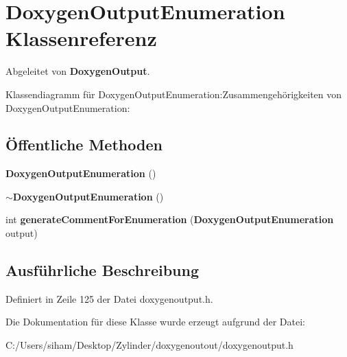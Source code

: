 \section{Doxygen\-Output\-Enumeration Klassenreferenz}
\label{class_doxygen_output_enumeration}
Abgeleitet von {\bf Doxygen\-Output}.

Klassendiagramm f\"{u}r Doxygen\-Output\-Enumeration:Zusammengeh\"{o}rigkeiten von Doxygen\-Output\-Enumeration:\subsection*{\"{O}ffentliche Methoden}
\begin{CompactItemize}
\item 
{\bf Doxygen\-Output\-Enumeration} ()\label{class_doxygen_output_enumeration_7ae367bb085b6095370b8ad098d81681}

\item 
{\bf $\sim$Doxygen\-Output\-Enumeration} ()\label{class_doxygen_output_enumeration_63cac653795dcc30b645c304c0881327}

\item 
int {\bf generate\-Comment\-For\-Enumeration} ({\bf Doxygen\-Output\-Enumeration} output)\label{class_doxygen_output_enumeration_2bcc08c5f6fb94e00db994fc7a325b9a}

\end{CompactItemize}


\subsection{Ausf\"{u}hrliche Beschreibung}




Definiert in Zeile 125 der Datei doxygenoutput.h.

Die Dokumentation f\"{u}r diese Klasse wurde erzeugt aufgrund der Datei:\begin{CompactItemize}
\item 
C:/Users/siham/Desktop/Zylinder/doxygenoutout/doxygenoutput.h\end{CompactItemize}
